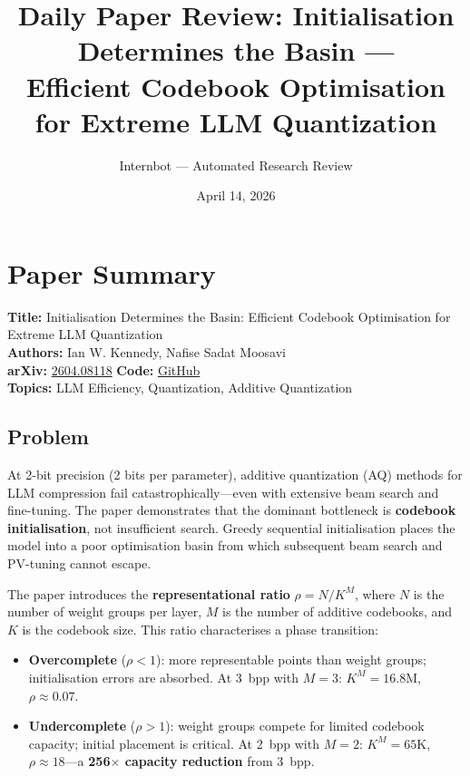 \documentclass[11pt]{article}
\title{Daily Paper Review: Initialisation Determines the Basin ---\\Efficient Codebook Optimisation for Extreme LLM Quantization}
\author{Internbot --- Automated Research Review}
\date{April 14, 2026}
\begin{document}
\maketitle

\section{Paper Summary}

\textbf{Title:} Initialisation Determines the Basin: Efficient Codebook Optimisation for Extreme LLM Quantization \\
\textbf{Authors:} Ian W. Kennedy, Nafise Sadat Moosavi \\
\textbf{arXiv:} \href{https://arxiv.org/abs/2604.08118}{2604.08118} \quad \textbf{Code:} \href{https://github.com/kenno94-IK/aqlm-oaem}{GitHub} \\
\textbf{Topics:} LLM Efficiency, Quantization, Additive Quantization

\subsection{Problem}

At 2-bit precision (2 bits per parameter), additive quantization (AQ) methods for LLM compression fail catastrophically---even with extensive beam search and fine-tuning. The paper demonstrates that the dominant bottleneck is \textbf{codebook initialisation}, not insufficient search. Greedy sequential initialisation places the model into a poor optimisation basin from which subsequent beam search and PV-tuning cannot escape.

The paper introduces the \textbf{representational ratio} $\rho = N / K^{M}$, where $N$ is the number of weight groups per layer, $M$ is the number of additive codebooks, and $K$ is the codebook size. This ratio characterises a phase transition:

\begin{itemize}
    \item \textbf{Overcomplete} ($\rho < 1$): more representable points than weight groups; initialisation errors are absorbed. At 3~bpp with $M=3$: $K^{M} = 16.8$M, $\rho \approx 0.07$.
    \item \textbf{Undercomplete} ($\rho > 1$): weight groups compete for limited codebook capacity; initial placement is critical. At 2~bpp with $M=2$: $K^{M} = 65$K, $\rho \approx 18$---a \textbf{256$\times$ capacity reduction} from 3~bpp.
\end{itemize}
\end{document}
